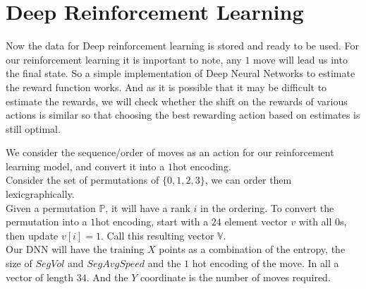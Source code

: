 \section{Deep Reinforcement Learning}
Now the data for Deep reinforcement learning is stored and ready to be used. For our reinforcement learning it is important to note, any $1$ move will lead us into the final state. So a simple implementation of Deep Neural Networks to estimate the reward function works. And as it is possible that it may be difficult to estimate the rewards, we will check whether the shift on the rewards of various actions is similar so that choosing the best rewarding action based on estimates is still optimal.
\par We consider the sequence/order of moves as an action for our reinforcement learning model, and convert it into a $1$hot encoding.\\
Consider the set of permutations of $\{0,1,2,3\}$, we can order them lexicgraphically.\\
Given a permutation $\mathbb{P}$, it will have a rank $i$ in the ordering. To convert the permutation into a $1$hot encoding, start with a $24$ element vector $v$ with all $0$s, then update $v[i]=1$. Call this resulting vector $\mathbb{V}$.\\
Our DNN will have the training $X$ points as a combination of the entropy, the size of $SegVol$ and $SegAvgSpeed$ and the $1$ hot encoding of the move. In all a vector of length $34$. And the $Y$ coordinate is the number of moves required.\\

